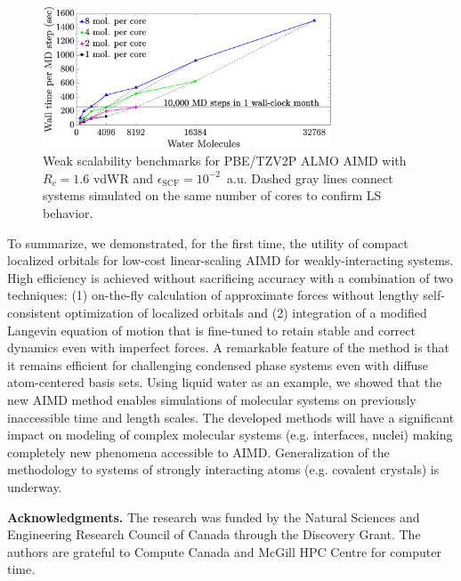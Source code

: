 \documentclass[aps,prl,reprint,amsmath,amssymb]{revtex4-1}
\begin{document}
\begin{figure}
\includegraphics[trim={1.6cm 0.8cm 4.7cm 0cm},clip,width=8.6cm]{weakscaling.eps}
\caption{\label{fig:weakscaling} Weak scalability benchmarks for PBE/TZV2P ALMO AIMD with  $R_{c} = 1.6$ vdWR and $\epsilon_{\text{SCF}} = 10^{-2}$~a.u. 
Dashed gray lines connect systems simulated on the same number of cores to confirm LS behavior. %
}
\end{figure}


To summarize, we demonstrated, for the first time, the utility of compact localized orbitals for low-cost linear-scaling AIMD for weakly-interacting systems. 
High efficiency is achieved without sacrificing accuracy with a combination of two techniques: (1) on-the-fly calculation of approximate forces without lengthy self-consistent optimization of localized orbitals and (2) integration of a modified Langevin equation of motion that is fine-tuned to retain stable and correct dynamics even with imperfect forces. 
A remarkable feature of the method is that it remains efficient for challenging condensed phase systems even with diffuse atom-centered basis sets. 
Using liquid water as an example, we showed that the new AIMD method enables simulations of molecular systems on previously inaccessible time and length scales. 
The developed methods will have a significant impact on modeling of complex molecular systems (e.g. interfaces, nuclei) making completely new phenomena accessible to AIMD. 
Generalization of the methodology to systems of strongly interacting atoms (e.g. covalent crystals) is underway.

\textbf{Acknowledgments.} The research was funded by the Natural Sciences and Engineering Research Council of Canada through the Discovery Grant. The authors are grateful to Compute Canada and McGill HPC Centre for computer time.
\end{document}
